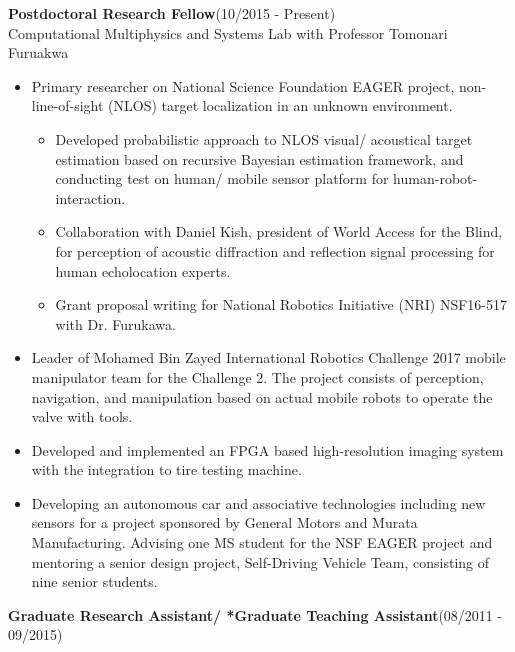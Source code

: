 \documentclass[11pt,letterpaper]{article}
\begin{document}
{\bfseries Postdoctoral Research Fellow}\hfill {(10/2015 - Present)}\\
Computational Multiphysics and Systems Lab with Professor Tomonari Furuakwa\\
\begin{itemize}
	\item Primary researcher on National Science Foundation EAGER project, non-line-of-sight (NLOS) target localization in an unknown environment.
	\begin{itemize}
		\item Developed probabilistic approach to NLOS visual/ acoustical target estimation based on recursive Bayesian estimation framework, and conducting test on human/ mobile sensor platform for human-robot-interaction.
		\item Collaboration with Daniel Kish, president of World Access for the Blind, for perception of acoustic diffraction and reflection signal processing for human echolocation experts.
		\item Grant proposal writing for National Robotics Initiative (NRI) NSF16-517 with Dr. Furukawa.
	\end{itemize}
	\item Leader of Mohamed Bin Zayed International Robotics Challenge 2017 mobile manipulator team for the Challenge 2. The project consists of perception, navigation, and manipulation based on actual mobile robots to operate the valve with tools.
	\item Developed and implemented an FPGA based high-resolution imaging system with the integration to tire testing machine.
	\item Developing an autonomous car and associative technologies including new sensors for a project sponsored by General Motors and Murata Manufacturing. Advising one MS student for the NSF EAGER project and mentoring a senior design project, Self-Driving Vehicle Team, consisting of nine senior students.  
\end{itemize}
{\bfseries Graduate Research Assistant/ *Graduate Teaching Assistant}\hfill {(08/2011 - 09/2015)}\\
\end{document}
